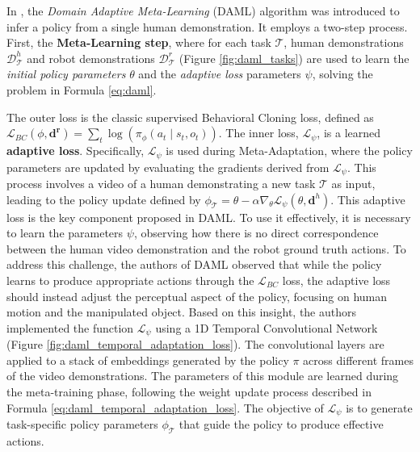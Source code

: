 In \cite{yu2018daml}, the \textit{Domain Adaptive Meta-Learning} (DAML) algorithm was introduced to infer a policy from a single human demonstration. 
\newline It employs a two-step process. First, the \textbf{Meta-Learning step}, where for each task $\mathcal{T}$, human demonstrations $\mathcal{D}^{h}_{\mathcal{T}}$ and robot demonstrations $\mathcal{D}^{r}_{\mathcal{T}}$ (Figure \ref{fig:daml_tasks}) are used to learn the \textit{initial policy parameters} $\theta$ and the \textit{adaptive loss} parameters $\psi$, solving the problem in Formula \ref{eq:daml}.

\newline The outer loss is the classic supervised Behavioral Cloning loss, defined as $\mathcal{L}_{BC}(\phi, \mathbf{d^{r}}) = \sum_{t} \log(\pi_{\phi}(a_{t} \mid s_{t}, o_{t}))$. The inner loss, $\mathcal{L}_{\psi}$, is a learned \textbf{adaptive loss}. Specifically, $\mathcal{L}_{\psi}$ is used during Meta-Adaptation, where the policy parameters are updated by evaluating the gradients derived from $\mathcal{L}_{\psi}$. This process involves a video of a human demonstrating a new task $\mathcal{T}$ as input, leading to the policy update defined by $\phi_{\mathcal{T}} = \theta - \alpha \nabla_{\theta} \mathcal{L}_{\psi}(\theta, \mathbf{d}^{h})$. 
\newline This adaptive loss is the key component proposed in DAML. To use it effectively, it is necessary to learn the parameters $\psi$, observing how there is no direct correspondence between the human video demonstration and the robot ground truth actions. To address this challenge, the authors of DAML observed that while the policy learns to produce appropriate actions through the $\mathcal{L}_{BC}$ loss, the adaptive loss should instead adjust the perceptual aspect of the policy, focusing on human motion and the manipulated object. Based on this insight, the authors implemented the function $\mathcal{L}_{\psi}$ using a 1D Temporal Convolutional Network (Figure \ref{fig:daml_temporal_adaptation_loss}). The convolutional layers are applied to a stack of embeddings generated by the policy $\pi$ across different frames of the video demonstrations. The parameters of this module are learned during the meta-training phase, following the weight update process described in Formula \ref{eq:daml_temporal_adaptation_loss}. The objective of $\mathcal{L}_{\psi}$ is to generate task-specific policy parameters $\phi_{\mathcal{T}}$ that guide the policy to produce effective actions.

